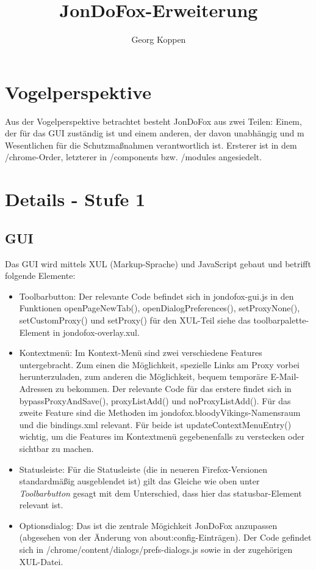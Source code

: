 \documentclass[a4paper,10pt]{scrartcl}
\title{JonDoFox-Erweiterung}
\author{Georg Koppen}
\begin{document}
  \maketitle
  \section{Vogelperspektive}
  Aus der Vogelperspektive betrachtet besteht JonDoFox aus zwei Teilen: Einem,
  der für das GUI zuständig ist und einem anderen, der davon unabhängig und m
  Wesentlichen für die Schutzmaßnahmen verantwortlich ist.
  Ersterer ist in dem /chrome-Order, letzterer in /components bzw. /modules
  angesiedelt.
  \section{Details - Stufe 1}
    \subsection{GUI}
      Das GUI wird mittels XUL (Markup-Sprache) und JavaScript gebaut und
      betrifft folgende Elemente:
      \begin{itemize}
        \item Toolbarbutton: Der relevante Code befindet sich in jondofox-gui.js
          in den Funktionen openPageNewTab(), openDialogPreferences(),
          setProxyNone(), setCustomProxy() und setProxy() für den XUL-Teil siehe
          das toolbarpalette-Element in jondofox-overlay.xul.
        \item Kontextmenü: Im Kontext-Menü sind zwei verschiedene Features
          untergebracht. Zum einen die Möglichkeit, spezielle Links am Proxy
          vorbei herunterzuladen, zum anderen die Möglichkeit, bequem temporäre
          E-Mail-Adressen zu bekommen. Der relevante Code für das erstere findet
          sich in bypassProxyAndSave(), proxyListAdd() und
          noProxyListAdd(). Für das zweite Feature sind die Methoden im
          jondofox.bloodyVikings-Namensraum und die bindings.xml relevant. Für
          beide ist updateContextMenuEntry() wichtig, um die Features im
          Kontextmenü gegebenenfalls zu verstecken oder sichtbar zu machen.
        \item Statusleiste: Für die Statusleiste (die in neueren
          Firefox-Versionen standardmäßig ausgeblendet ist) gilt das Gleiche wie
          oben unter \textit{Toolbarbutton} gesagt mit dem Unterschied, dass
          hier das statusbar-Element relevant ist.
        \item Optionsdialog: Das ist die zentrale Mögichkeit JonDoFox anzupassen
          (abgesehen von der Änderung von about:config-Einträgen). Der Code
          gefindet sich in /chrome/content/dialogs/prefs-dialogs.js sowie in der
          zugehörigen XUL-Datei.
      \end{itemize}
\end{document}
